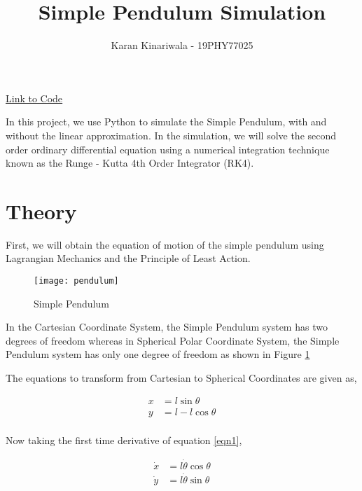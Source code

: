 \documentclass[12pt]{article}
\title{Simple Pendulum Simulation}
\author{Karan Kinariwala - 19PHY77025}
\begin{document}
\maketitle

\begin{center}
    \textcolor{blue}{\underline{\href{https://github.com/kkin1995/simulations/}{Link to Code}}}
\end{center}



In this project, we use Python to simulate the Simple Pendulum, with and without the linear approximation.
In the simulation, we will solve the second order ordinary differential equation using a numerical integration
technique known as the Runge - Kutta 4th Order Integrator (RK4). \newline

\section{Theory}

First, we will obtain the equation of motion of the simple pendulum using Lagrangian Mechanics and the Principle of Least
Action. \newline

\begin{figure}
    \caption{Simple Pendulum}
    \texttt{[image: pendulum]}
    \label{fig:sp}
\end{figure}

In the Cartesian Coordinate System, the Simple Pendulum system has two degrees of freedom whereas
in Spherical Polar Coordinate System, the Simple Pendulum system has only one degree of freedom as shown in Figure \ref{fig:sp} \newline

The equations to transform from Cartesian to Spherical Coordinates are given as,

\begin{equation} \label{eqn1}
    \begin{split}
        x &= l\sin{\theta} \\ 
        y &= l - l\cos{\theta} \\
    \end{split}
\end{equation}

Now taking the first time derivative of equation \ref{eqn1},

\begin{equation} \label{eqn2}
    \begin{split}
        \dot{x} &= l \dot{\theta} \cos{\theta}  \\
        \dot{y} &= l \dot{\theta} \sin{\theta}  \\
    \end{split}
\end{equation}
\end{document}
